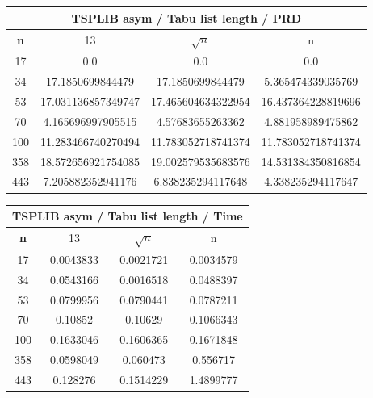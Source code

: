 \documentclass{article}
\begin{document}
\begin{center}
\begin{tabular}{|c|c|c|c|}
\hline
\multicolumn{4}{|c|}{\textbf{TSPLIB asym / Tabu list length / PRD}}\\
\hline
\textbf{n} & 13 & $\sqrt{n}$ & n\\
\hline
17 & 0.0 & 0.0 & 0.0\\
\hline
34 & 17.1850699844479 & 17.1850699844479 & 5.365474339035769\\
\hline
53 & 17.031136857349747 & 17.465604634322954 & 16.437364228819696\\
\hline
70 & 4.165696997905515 & 4.57683655263362 & 4.881958989475862\\
\hline
100 & 11.283466740270494 & 11.783052718741374 & 11.783052718741374\\
\hline
358 & 18.572656921754085 & 19.002579535683576 & 14.531384350816854\\
\hline
443 & 7.205882352941176 & 6.838235294117648 & 4.338235294117647\\
\hline
\end{tabular}
\end{center}


\begin{center}
\begin{tabular}{|c|c|c|c|}
\hline
\multicolumn{4}{|c|}{\textbf{TSPLIB asym / Tabu list length / Time}}\\
\hline
\textbf{n} & 13 & $\sqrt{n}$ & n\\
\hline
17 & 0.0043833 & 0.0021721 & 0.0034579\\
\hline
34 & 0.0543166 & 0.0016518 & 0.0488397\\
\hline
53 & 0.0799956 & 0.0790441 & 0.0787211\\
\hline
70 & 0.10852 & 0.10629 & 0.1066343\\
\hline
100 & 0.1633046 & 0.1606365 & 0.1671848\\
\hline
358 & 0.0598049 & 0.060473 & 0.556717\\
\hline
443 & 0.128276 & 0.1514229 & 1.4899777\\
\hline
\end{tabular}
\end{center}
\end{document}
